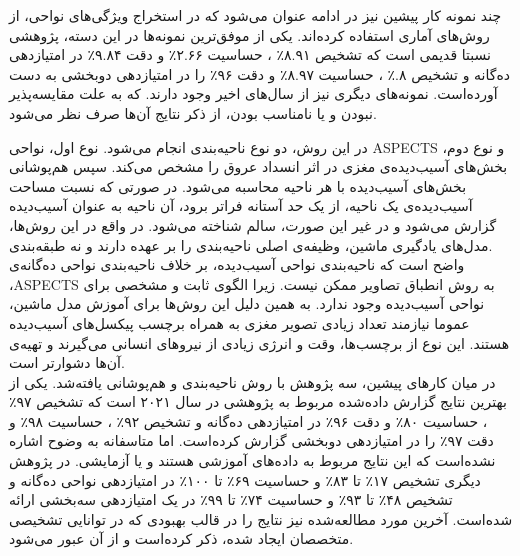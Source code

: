 چند نمونه کار پیشین نیز در ادامه عنوان می‌شود که در استخراج ویژگی‌های نواحی، از روش‌های آماری استفاده کرده‌اند.
یکی از موفق‌ترین نمونه‌ها در این دسته، پژوهشی نسبتا قدیمی است که
تشخیص
۸.۹۱٪
،
حساسیت
۲.۶۶٪
و دقت 
۹.۸۴٪
در امتیازدهی ده‌گانه و 
تشخیص
۸.٪
،
حساسیت
۸.۹۷٪
و دقت 
۹۶٪
را
در امتیازدهی دوبخشی 
به دست آورده‌است.
نمونه‌های دیگری نیز از سال‌های اخیر وجود دارند.
که به علت مقایسه‌پذیر نبودن و یا نامناسب بودن، از ذکر نتایج آن‌ها صرف نظر می‌شود.

در این روش، دو نوع ناحیه‌بندی انجام می‌شود.
نوع اول، نواحی ASPECTS و نوع دوم،
بخش‌های آسیب‌دیده‌ی مغزی در اثر انسداد عروق 
را مشخص می‌کند.
سپس هم‌پوشانی بخش‌های آسیب‌دیده با هر ناحیه محاسبه می‌شود.
در صورتی که نسبت مساحت آسیب‌دیده‌ی یک ناحیه، از یک حد آستانه فراتر برود، آن ناحیه به عنوان آسیب‌دیده گزارش می‌شود و در غیر این صورت، سالم شناخته می‌شود.
در واقع در این روش‌ها، مدل‌های یادگیری ماشین، وظیفه‌ی اصلی ناحیه‌بندی را بر عهده دارند و نه طبقه‌بندی.\\

واضح است که ناحیه‌بندی نواحی آسیب‌دیده، بر خلاف ناحیه‌بندی نواحی ده‌گانه‌ی ،ASPECTS
به روش انطباق تصاویر ممکن نیست.
زیرا الگوی ثابت و مشخصی برای نواحی آسیب‌دیده وجود ندارد.
به همین دلیل این روش‌ها برای آموزش مدل ماشین، عموما نیازمند تعداد زیادی تصویر مغزی به همراه برچسب پیکسل‌های آسیب‌دیده هستند.
این نوع از برچسب‌ها، وقت و انرژی زیادی از نیرو‌های انسانی می‌گیرند و تهیه‌ی آن‌ها دشوارتر است.\\

در میان کارهای پیشین،
سه پژوهش با
روش ناحیه‌بندی و هم‌پوشانی
یافته‌شد.
یکی از بهترین نتایج 
گزارش داده‌شده مربوط به پژوهشی در سال ۲۰۲۱ است
که
تشخیص
۹۷٪
،
حساسیت
۸۰٪
و دقت 
۹۶٪
در امتیازدهی ده‌گانه و 
تشخیص
۹۲٪
،
حساسیت
۹۸٪
و دقت 
۹۷٪
را
در امتیازدهی دوبخشی 
گزارش کرده‌است.
اما متاسفانه به وضوح اشاره نشده‌است که این نتایج مربوط به داده‌های آموزشی هستند و یا آزمایشی.
در پژوهش دیگری
تشخیص
۱۷٪
تا
۸۳٪
و
حساسیت
۶۹٪
تا
۱۰۰٪
در امتیازدهی نواحی ده‌گانه و 
تشخیص
۴۸٪
تا
۹۳٪
و
حساسیت
۷۴٪
تا
۹۹٪
در یک امتیازدهی سه‌بخشی 
ارائه شده‌است.
آخرین مورد مطالعه‌شده نیز نتایج را در قالب 
بهبودی که در توانایی تشخیصی متخصصان ایجاد شده، ذکر کرده‌است و از آن عبور می‌شود.

